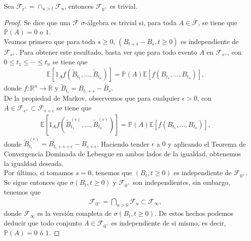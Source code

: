 \begin{theorem}
Sea $\mathcal{F}_{t^{+}} = \cap_{u > t} \mathcal{F}_u$, entonces $\mathcal{F}_{0^{+}}$ es trivial.
\end{theorem}
\begin{proof}
Se dice que una $\mathcal{F}$ $\sigma$-álgebra es trivial si, para toda $A \in \mathcal{F}$, se tiene que $\mathbb{P}(A) = 0$ o $1$. \\

Veamos primero que para toda $s \geq 0$, $(B_{t+s} - B_s, t \geq 0)$ es independiente de $\mathcal{F}_{s^{+}}$. Para obtener este resultado, basta ver que para todo evento $A$ en $\mathcal{F}_{s^{+}}$, con $0 \leq t_1 \leq \cdots \leq t_n$ se tiene que
	 \begin{align*}
	 \mathbb{E} \left[ 1_A f \left( \tilde{B}_{t_1}, \ldots, \tilde{B}_{t_n} \right) \right] = \mathbb{P} (A) \mathbb{E} \left[ f \left( B_{t_1}, \ldots, B_{t_n} \right) \right],
	 \end{align*}
donde $f : \mathbb{R}^n \rightarrow \mathbb{R}$ y $\tilde{B}_{t_i} = B_{t_i + s} - B_s$. \\

De la propiedad de Markov, observemos que para cualquier $\epsilon > 0$, con $A \in \mathcal{F}_{s^{+}} \subset \mathcal{F}_{s + \epsilon}$ se tiene que
	 \begin{align*}
	 \mathbb{E} \left[ 1_A f \left( \tilde{B}_{t_1}^{(\epsilon)}, \ldots, \tilde{B}_{t_n}^{(\epsilon)} \right) \right] = \mathbb{P} (A) \mathbb{E} \left[ f \left( B_{t_1}, \ldots, B_{t_n} \right) \right],
	 \end{align*}
donde $\tilde{B}_{t_i}^{(\epsilon)} = B_{t_i + s + \epsilon} - B_{s + \epsilon}$. Haciendo tender $\epsilon$ a $0$ y aplicando el Teorema de Convergencia Dominada de Lebesgue en ambos lados de la igualdad, obtenemos la igualdad deseada. \\

Por último, si tomamos $s = 0$, tenemos que $(B_t, t \geq 0)$ es independiente de $\mathcal{F}_{0^{+}}$. Se sigue entonces que $\sigma(B_t, t \geq 0)$ y $\mathcal{F}_{0^{+}}$ son independientes, sin embargo, tenemos que 
	\begin{align*}
	\mathcal{F}_{0^{+}} = \bigcap_{u > 0} \mathcal{F}_u \subset \mathcal{F}_{\infty},
	\end{align*}
donde $\mathcal{F}_{\infty}$ es la versión completa de $\sigma(B_t, t \geq 0)$. De estos hechos podemos deducir que todo conjunto $A \in \mathcal{F}_{0^{+}}$ es independiente de si mismo, es decir, $\mathbb{P} (A) = 0$ ó $1$.
\end{proof}


